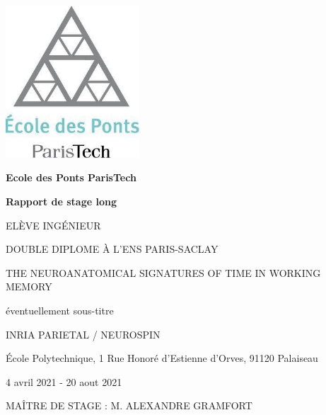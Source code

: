 \begin{titlepage}
    \begin{center}
        
        
        \includegraphics[width=5cm]{preliminaries/images/logo_ponts.jpg}
        
        \vspace{0.5cm}
        
        \textbf{Ecole des Ponts ParisTech}

        \vspace{1.5cm}
        
        \textbf{\Large Rapport de stage long}
        
        \vspace{0.5cm}
        
        \MakeUppercase{\theauthor{}}
        
        \MakeUppercase{Elève ingénieur}
        
        \MakeUppercase{Double diplome à l'ENS Paris-Saclay}
        
        \vspace{1.5cm}
        
        \MakeUppercase{The neuroanatomical signatures of time in working memory}
        
        éventuellement sous-titre
    
        
        
        
        \vfill
        
        \MakeUppercase{INRIA Parietal / Neurospin}
        
        École Polytechnique, 1 Rue Honoré d'Estienne d'Orves, 91120 Palaiseau
        
        4 avril 2021 - 20 aout 2021
        
        \MakeUppercase{Maître de stage : M. Alexandre Gramfort}
        


        
    
        
    \end{center}
\end{titlepage}
